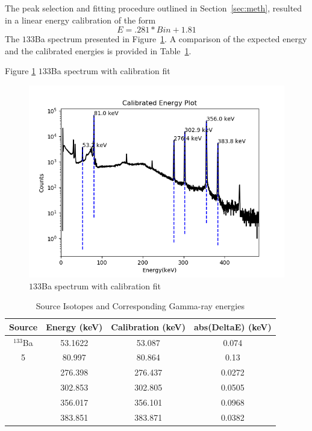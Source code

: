        The peak selection and fitting procedure outlined in Section~\ref{sec:meth}, resulted in a linear energy calibration of the form
\begin{equation}
E = .281*Bin + 1.81
\end{equation}
The ${133}$Ba spectrum presented in Figure~\ref{fig:BaSpec}. A comparison of the expected energy and the calibrated energies is provided in Table~\ref{tab:Comp}.


Figure \ref{fig:BaSpec} ${133}$Ba spectrum with calibration fit

\begin{figure}[!htb]
\centering
\includegraphics[width=0.5\linewidth]{images/Ba133_calibrated.png}
\caption{ ${133}$Ba spectrum with calibration fit}
\label{fig:BaSpec}
\end{figure}



\begin{table}[H]
        \begin{center}
                \begin{tabular}{ c c c c }
                        \textbf{Source} & \textbf{Energy (keV)} & \textbf{Calibration (keV)} & \textbf{abs(DeltaE) (keV)} \\
                        \hline
                        $^{133}$Ba      &      53.1622  &   53.087    & 0.074     \\5
                                                &       80.997  &       80.864  &       0.13    \\
                                                &       276.398 &       276.437 &       0.0272    \\
                                                &       302.853 &       302.805 &       0.0505   \\
                                                &       356.017 &       356.101 &       0.0968     \\
                                                &       383.851 &       383.871 &       0.0382    \\
                \end{tabular}
                \caption{Source Isotopes and Corresponding Gamma-ray energies}
                \label{tab:Comp}
        \end{center}
\end{table}
